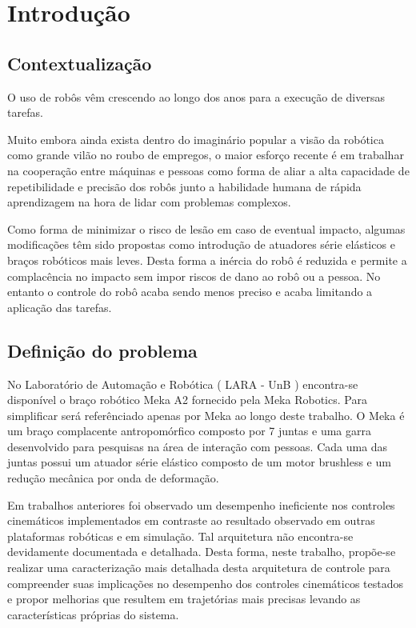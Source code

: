 \chapter{Introdução} \label{ch:intro}


\section{Contextualização}

O uso de robôs vêm crescendo ao longo dos anos para a execução de diversas tarefas.

Muito embora ainda exista dentro do imaginário popular a visão da robótica como grande vilão no roubo de empregos, o maior esforço recente é em trabalhar na cooperação entre máquinas e pessoas como forma de aliar a alta capacidade de repetibilidade e precisão dos robôs junto a habilidade humana de rápida aprendizagem na hora de lidar com problemas complexos.

Como forma de minimizar o risco de lesão em caso de eventual impacto, algumas modificações têm sido propostas como introdução de atuadores série elásticos e braços robóticos mais leves. Desta forma a inércia do robô é reduzida e permite a complacência no impacto sem impor riscos de dano ao robô ou a pessoa. No entanto o controle do robô acaba sendo menos preciso e acaba limitando a aplicação das tarefas.


\section{Definição do problema}

No Laboratório de Automação e Robótica ( LARA - UnB ) encontra-se disponível o braço robótico Meka A2 fornecido pela Meka Robotics. Para simplificar será referênciado apenas por Meka ao longo deste trabalho. O Meka é um braço complacente antropomórfico composto por 7 juntas e uma garra desenvolvido para pesquisas na área de interação com pessoas. Cada uma das juntas possui um atuador série elástico composto de um motor brushless e um redução mecânica por onda de deformação.

Em trabalhos anteriores foi observado um desempenho ineficiente nos controles cinemáticos implementados em contraste ao resultado observado em outras plataformas robóticas e em simulação. Tal arquitetura não encontra-se devidamente documentada e detalhada. Desta forma, neste trabalho, propõe-se realizar uma caracterização mais detalhada desta arquitetura de controle para compreender suas implicações no desempenho dos controles cinemáticos testados e propor melhorias que resultem em trajetórias mais precisas levando as características próprias do sistema.

